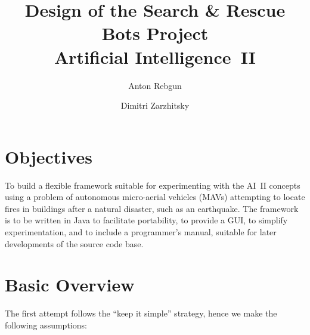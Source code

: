 \documentclass{article}
\begin{document}
\title{Design of the Search \& Rescue Bots Project \\
       Artificial Intelligence~II}
\author{Anton Rebgun \and Dimitri Zarzhitsky}
\maketitle

\section{Objectives}
To build a flexible framework suitable for experimenting with the AI~II concepts using a problem of autonomous micro-aerial vehicles (MAVs) attempting to locate fires in buildings after a natural disaster, such as an earthquake.  The framework is to be written in Java to facilitate portability, to provide a GUI, to simplify experimentation, and to include a programmer's manual, suitable for later developments of the source code base.

\section{Basic Overview}
The first attempt follows the ``keep it simple'' strategy, hence we make the following assumptions:
\end{document}
